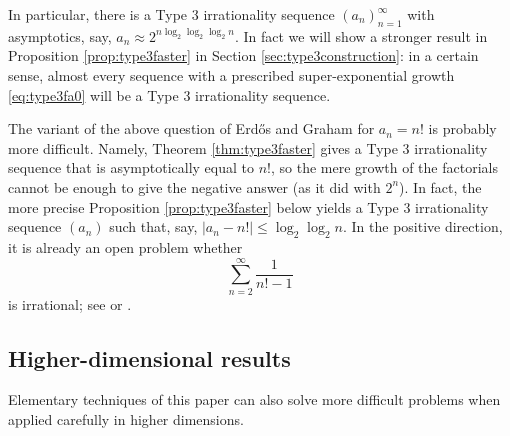 \documentclass[11pt,letterpaper,reqno]{amsart}
\numberwithin{equation}{section}
\theoremstyle{definition}
\numberwithin{equation}{section}
\begin{document}
In particular, there is a Type 3 irrationality sequence $(a_n)_{n=1}^{\infty}$ with asymptotics, say, $a_n \approx 2^{n \log_2 \log_2 \log_2 n}$.
In fact we will show a stronger result in Proposition \ref{prop:type3faster} in Section \ref{sec:type3construction}: in a certain sense, almost every sequence with a prescribed super-exponential growth \eqref{eq:type3fa0} will be a Type 3 irrationality sequence.

The variant of the above question of Erd\H{o}s and Graham for $a_n=n!$ is probably more difficult.
Namely, Theorem \ref{thm:type3faster} gives a Type 3 irrationality sequence that is asymptotically equal to $n!$, so the mere growth of the factorials cannot be enough to give the negative answer (as it did with $2^n$).
In fact, the more precise Proposition \ref{prop:type3faster} below yields a Type 3 irrationality sequence $(a_n)$ such that, say, $|a_n-n!| \leqslant \log_2 \log_2 n$.
In the positive direction, it is already an open problem whether
\[ \sum_{n=2}^{\infty} \frac{1}{n!-1} \]
is irrational; see \cite[p.~2]{E75} or \cite[Problem \#68]{EP}.


\subsection{Higher-dimensional results}

Elementary techniques of this paper can also solve more difficult problems when applied carefully in higher dimensions.
\end{document}
